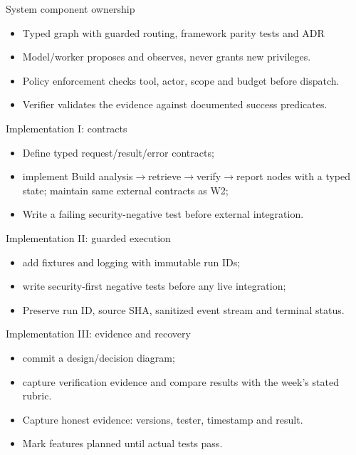 \documentclass[aspectratio=169,10pt]{beamer}
\begin{document}
\begin{frame}{System component ownership}
\small
\begin{itemize}
\item Typed graph with guarded routing, framework parity tests and ADR
\item Model/worker proposes and observes, never grants new privileges.
\item Policy enforcement checks tool, actor, scope and budget before dispatch.
\item Verifier validates the evidence against documented success predicates.
\end{itemize}

\end{frame}

\begin{frame}{Implementation I: contracts}
\small
\begin{itemize}
\item Define typed request/result/error contracts;
\item implement Build analysis$\rightarrow$retrieve$\rightarrow$verify$\rightarrow$report nodes with a typed state; maintain same external contracts as W2;
\item Write a failing security-negative test before external integration.
\end{itemize}

\end{frame}

\begin{frame}{Implementation II: guarded execution}
\small
\begin{itemize}
\item add fixtures and logging with immutable run IDs;
\item write security-first negative tests before any live integration;
\item Preserve run ID, source SHA, sanitized event stream and terminal status.
\end{itemize}

\end{frame}

\begin{frame}{Implementation III: evidence and recovery}
\small
\begin{itemize}
\item commit a design/decision diagram;
\item capture verification evidence and compare results with the week's stated rubric.
\item Capture honest evidence: versions, tester, timestamp and result.
\item Mark features planned until actual tests pass.
\end{itemize}

\end{frame}
\end{document}
